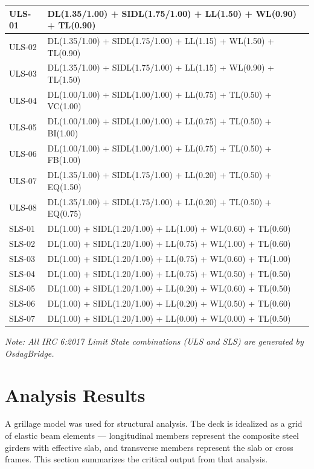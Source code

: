 \documentclass[12pt,a4paper]{report}
\numberwithin{table}{chapter}
\numberwithin{figure}{chapter}
\begin{document}
\begin{longtable}{|C{3.5cm}|p{12.0cm}|}
ULS-01 & DL(1.35/1.00) + SIDL(1.75/1.00) + LL(1.50) + WL(0.90) + TL(0.90) \\[4pt]
\hline
ULS-02 & DL(1.35/1.00) + SIDL(1.75/1.00) + LL(1.15) + WL(1.50) + TL(0.90) \\[4pt]
\hline
ULS-03 & DL(1.35/1.00) + SIDL(1.75/1.00) + LL(1.15) + WL(0.90) + TL(1.50) \\[4pt]
\hline
ULS-04 & DL(1.00/1.00) + SIDL(1.00/1.00) + LL(0.75) + TL(0.50) + VC(1.00) \\[4pt]
\hline
ULS-05 & DL(1.00/1.00) + SIDL(1.00/1.00) + LL(0.75) + TL(0.50) + BI(1.00) \\[4pt]
\hline
ULS-06 & DL(1.00/1.00) + SIDL(1.00/1.00) + LL(0.75) + TL(0.50) + FB(1.00) \\[4pt]
\hline
ULS-07 & DL(1.35/1.00) + SIDL(1.75/1.00) + LL(0.20) + TL(0.50) + EQ(1.50) \\[4pt]
\hline
ULS-08 & DL(1.35/1.00) + SIDL(1.75/1.00) + LL(0.20) + TL(0.50) + EQ(0.75) \\[4pt]
\hline
SLS-01 & DL(1.00) + SIDL(1.20/1.00) + LL(1.00) + WL(0.60) + TL(0.60) \\[4pt]
\hline
SLS-02 & DL(1.00) + SIDL(1.20/1.00) + LL(0.75) + WL(1.00) + TL(0.60) \\[4pt]
\hline
SLS-03 & DL(1.00) + SIDL(1.20/1.00) + LL(0.75) + WL(0.60) + TL(1.00) \\[4pt]
\hline
SLS-04 & DL(1.00) + SIDL(1.20/1.00) + LL(0.75) + WL(0.50) + TL(0.50) \\[4pt]
\hline
SLS-05 & DL(1.00) + SIDL(1.20/1.00) + LL(0.20) + WL(0.60) + TL(0.50) \\[4pt]
\hline
SLS-06 & DL(1.00) + SIDL(1.20/1.00) + LL(0.20) + WL(0.50) + TL(0.60) \\[4pt]
\hline
SLS-07 & DL(1.00) + SIDL(1.20/1.00) + LL(0.00) + WL(0.00) + TL(0.50) \\[4pt]
\hline
\end{longtable}

\noindent\textit{Note: All IRC 6:2017 Limit State combinations (ULS and SLS) are generated by OsdagBridge.}


\chapter{Analysis Results}

A grillage model was used for structural analysis. The deck is idealized as a grid of elastic beam elements --- longitudinal members represent the composite steel girders with effective slab, and transverse members represent the slab or cross frames. This section summarizes the critical output from that analysis.
\end{document}
